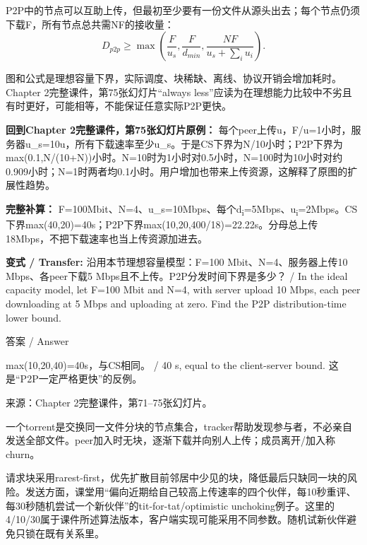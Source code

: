 P2P中的节点可以互助上传，但最初至少要有一份文件从源头出去；每个节点仍须下载F，所有节点总共需NF的接收量：
\[
D_{p2p}\ge\max\left(\frac F{u_s},\frac F{d_{min}},\frac{NF}{u_s+\sum_i u_i}\right).\tag{2.2}
\]


图和公式是理想容量下界，实际调度、块稀缺、离线、协议开销会增加耗时。Chapter 2完整课件，第75张幻灯片“always less”应读为在理想能力比较中不劣且有时更好，可能相等，不能保证任意实际P2P更快。


\textbf{回到Chapter 2完整课件，第75张幻灯片原例：} 每个peer上传u，F/u=1小时，服务器u\_s=10u，所有下载速率至少u\_s。于是CS下界为N/10小时；P2P下界为max(0.1,N/(10+N))小时。N=10时为1小时对0.5小时，N=100时为10小时对约0.909小时；N=1时两者均0.1小时。用户增加也带来上传资源，这解释了原图的扩展性趋势。


\textbf{完整补算：} F=100Mbit、N=4、u\_s=10Mbps、每个d\textsubscript{i}=5Mbps、u\textsubscript{i}=2Mbps。CS下界max(40,20)=40s；P2P下界max(10,20,400/18)=22.22s。分母总上传18Mbps，不把下载速率也当上传资源加进去。


\textbf{变式 / Transfer:} 沿用本节理想容量模型：F=100 Mbit、N=4、服务器上传10 Mbps、各peer下载5 Mbps且不上传。P2P分发时间下界是多少？ / In the ideal capacity model, let F=100 Mbit and N=4, with server upload 10 Mbps, each peer downloading at 5 Mbps and uploading at zero. Find the P2P distribution-time lower bound.



\begin{StudySolution}{答案 / Answer}


max(10,20,40)=40s，与CS相同。 / 40 s, equal to the client-server bound. 这是“P2P一定严格更快”的反例。


\end{StudySolution}


来源：Chapter 2完整课件，第71–75张幻灯片。








一个torrent是交换同一文件分块的节点集合，tracker帮助发现参与者，不必亲自发送全部文件。peer加入时无块，逐渐下载并向别人上传；成员离开/加入称churn。


请求块采用rarest-first，优先扩散目前邻居中少见的块，降低最后只缺同一块的风险。发送方面，课堂用“偏向近期给自己较高上传速率的四个伙伴，每10秒重评、每30秒随机尝试一个新伙伴”的tit-for-tat/optimistic unchoking例子。这里的4/10/30属于课件所述算法版本，客户端实现可能采用不同参数。随机试新伙伴避免只锁在既有关系里。


